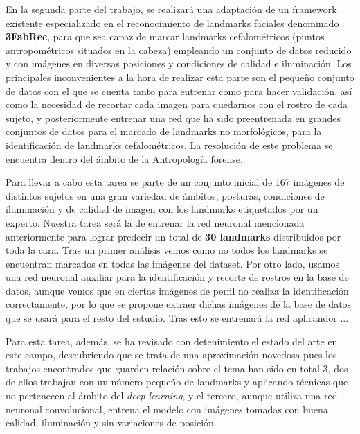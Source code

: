 \medskip

\noindent En la segunda parte del trabajo, se realizará una adaptación de un framework existente especializado en el reconocimiento de landmarks faciales denominado \textbf{3FabRec}, para que sea capaz de marcar landmarks cefalométricos (puntos antropométricos situados en la cabeza) empleando un conjunto de datos reducido y con imágenes en diversas posiciones y condiciones de calidad e iluminación. Los principales inconvenientes a la hora de realizar esta parte son el pequeño conjunto de datos con el que se cuenta tanto para entrenar como para hacer validación, así como la necesidad de recortar cada imagen para quedarnos con el rostro de cada sujeto, y posteriormente entrenar una red que ha sido preentrenada en grandes conjuntos de datos para el marcado de landmarks no morfológicos, para la identificación de landmarks cefalométricos. La resolución de este problema se encuentra dentro del ámbito de la Antropología forense.

\medskip

\noindent Para llevar a cabo esta tarea se parte de un conjunto inicial de 167 imágenes de distintos sujetos en una gran variedad de ámbitos, posturas, condiciones de iluminación y de calidad de imagen con los landmarks etiquetados por un experto.  Nuestra tarea será la de entrenar la red neuronal mencionada anteriormente para lograr predecir un total de \textbf{30 landmarks} distribuidos por toda la cara. Tras un primer análisis vemos como no todos los landmarks se encuentran marcados en todas las imágenes del dataset. Por otro lado, usamos una red neuronal auxiliar para la identificación y recorte de rostros en la base de datos, aunque vemos que en ciertas imágenes de perfil no realiza la identificación correctamente, por lo que se propone extraer dichas imágenes de la base de datos que se usará para el resto del estudio. Tras esto se entrenará la red aplicandor ...


\medskip

\noindent Para esta tarea, además, se ha revisado con detenimiento el estado del arte en este campo, descubriendo que se trata de una aproximación novedosa pues los trabajos encontrados que guarden relación sobre el tema han sido en total 3, dos de ellos trabajan con un número pequeño de landmarks y aplicando técnicas que no pertenecen al ámbito del \textit{deep learning}, y el tercero, aunque utiliza una red neuronal convolucional, entrena el modelo con imágenes tomadas con buena calidad, iluminación y sin variaciones de posición.


\endinput
